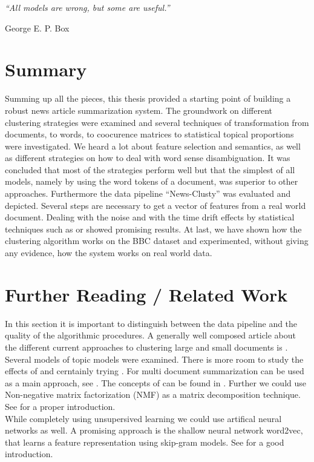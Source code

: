 \epigraph{\emph{
  ``All models are wrong, but some are useful.''
}}{ George E. P. Box }

\section{Summary}
\label{sec:summary}
Summing up all the pieces, this thesis provided a starting point of building a robust  news article summarization system. The groundwork on different clustering strategies were examined and several techniques of transformation from documents, to words, to coocurence matrices to statistical topical proportions were investigated. We heard a lot about feature selection and semantics, as well as different strategies on how to deal with word sense disambiguation. It was concluded that most of the strategies perform well but that the simplest of all models, namely by using the word tokens of a document, was superior to other approaches. Furthermore the data pipeline ``News-Clusty'' was evaluated and depicted. Several steps are necessary to get a vector of features from a real world document. Dealing with the noise and with the time drift effects by statistical techniques such as \lsa{} or \lda{} showed promising results. At last, we have shown how the clustering algorithm works on the BBC dataset and experimented, without giving any evidence, how the system works on real world data.

\section{Further Reading / Related Work}
\label{sec:further_reading}
In this section it is important to distinguish between the data pipeline and the quality of the algorithmic procedures. A generally well composed article about the different current approaches to clustering large and small documents is \cite{NextFrontierClustering2013}.\\

Several models of topic models were examined. There is more room to study the effects of \lda{} and cerntainly trying \hdp{}. For multi document summarization \lda{} can be used as a main approach, see \cite{MultiDocSumLDA2008}. The concepts of \hdpfull{} can be found in \cite{NonParametricBayes2007, HDP2006}. Further we could use Non-negative matrix factorization (NMF) as a matrix decomposition technique. See \cite{NMF1999} for a proper introduction.\\

While completely using unsupersived learning we could use artifical neural networks as well. A promising approach is the shallow neural network word2vec, that learns a feature representation using skip-gram models. See \cite{Word2Vec2014} for a good introduction.\\


